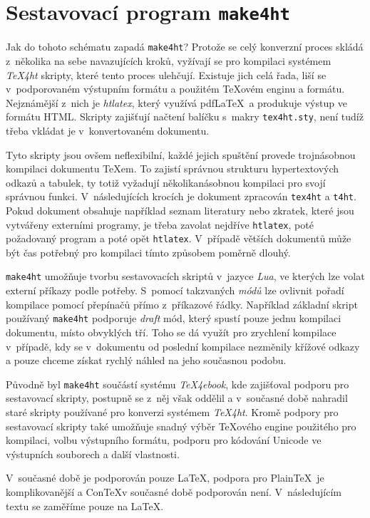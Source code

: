\documentclass{csbulletin}
\newcommand\nazev[1]{\textit{#1}}
\newcommand\prikaz[1]{\texttt{#1}}
\begin{document}
\section{Sestavovací program \prikaz{make4ht}}

Jak do tohoto schématu zapadá \prikaz{make4ht}? Protože se celý konverzní proces
skládá z~několika na sebe navazujících kroků, vyžívají se pro kompilaci
systémem \nazev{TeX4ht} skripty, které tento proces ulehčují. Existuje jich
celá řada, liší se v~podporovaném výstupním formátu a použitém \TeX ovém enginu
a formátu. Nejznámější z~nich je \nazev{htlatex}, který využívá pdf\LaTeX\ a
produkuje výstup ve formátu HTML. Skripty zajišťují načtení balíčku s~makry
\prikaz{tex4ht.sty}, není tudíž třeba vkládat je v~konvertovaném dokumentu.

Tyto skripty jsou ovšem neflexibilní, každé jejich spuštění provede
trojnásobnou kompilaci dokumentu \TeX em. To zajistí správnou strukturu
hypertextových odkazů a tabulek, ty totiž vyžadují několikanásobnou kompilaci
pro svojí správnou funkci. V~následujících krocích je dokument zpracován
\prikaz{tex4ht} a \prikaz{t4ht}. Pokud dokument obsahuje například seznam
literatury nebo zkratek, které jsou vytvářeny externími programy, je třeba
zavolat nejdříve \prikaz{htlatex}, poté požadovaný program a poté opět
\prikaz{htlatex}. V~případě větších dokumentů může být čas potřebný pro
kompilaci tímto způsobem poměrně dlouhý.

\prikaz{make4ht} umožňuje tvorbu sestavovacích skriptů v~jazyce \nazev{Lua}, ve
kterých lze volat externí příkazy podle potřeby. S~pomocí takzvaných
\nazev{módů} lze ovlivnit pořadí kompilace pomocí přepínačů přímo z~příkazové
řádky. Například základní skript používaný \prikaz{make4ht} podporuje
\nazev{draft} mód, který spustí pouze jednu kompilaci dokumentu, místo
obvyklých tří. Toho se dá využít pro zrychlení kompilace v~případě, kdy se
v~dokumentu od poslední kompilace nezměnily křížové odkazy a pouze chceme získat
rychlý náhled na jeho současnou podobu.

Původně byl \prikaz{make4ht} součástí systému \nazev{TeX4ebook}, kde zajišťoval
podporu pro sestavovací skripty, postupně se z~něj však oddělil a v~současné
době nahradil staré skripty používané pro konverzi systémem \nazev{TeX4ht}. 
Kromě podpory pro sestavovací skripty také umožňuje snadný výběr \TeX ového
engine použitého pro kompilaci, volbu výstupního formátu, podporu pro kódování
Unicode ve výstupních souborech a další vlastnosti.

V~současné době je podporován pouze \LaTeX, podpora pro Plain\TeX\ je
komplikovanější a Con\TeX v současné době podporován není. V~následujícím textu
se zaměříme pouze na \LaTeX.
\end{document}
